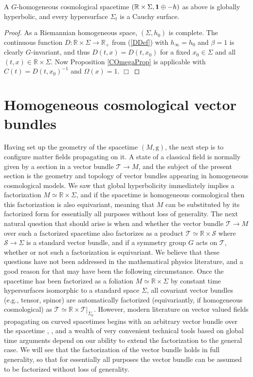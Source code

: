 \documentclass{article}
\begin{document}
\begin{proposition} A $G$-homogeneous cosmological spacetime $(\mathbb{R}\times\Sigma,{\mathbf 1}\oplus-h)$ as above is globally hyperbolic, and every hypersurface $\Sigma_t$ is a Cauchy surface.
\end{proposition}
\begin{proof} As a Riemannian homogeneous space, $(\Sigma,h_0)$ is complete. The continuous function $D:\mathbb{R}\times\Sigma\to\mathbb{R}_+$ from (\ref{DDef}) with $h_\infty=h_0$ and $\beta=1$ is clearly $G$-invariant, and thus $D(t,x)=D(t,x_0)$ for a fixed $x_0\in\Sigma$ and all $(t,x)\in\mathbb{R}\times\Sigma$. Now Proposition \ref{COmegaProp} is applicable with $C(t)=D(t,x_0)^{-1}$ and $\Omega(x)=1$. $\Box$
\end{proof}

\section*{Homogeneous cosmological vector bundles}

Having set up the geometry of the spacetime $(M,\mathrm{g})$, the next step is to configure matter fields propagating on it. A state of a classical field is normally given by a section in a vector bundle $\mathcal{T}\to M$, and the subject of the present section is the geometry and topology of vector bundles appearing in homogeneous cosmological models. We saw that global hyperbolicity immediately implies a factorization $M\simeq\mathbb{R}\times\Sigma$, and if the spacetime is homogeneous cosmological then this factorization is also equivariant, meaning that $M$ can be substituted by its factorized form for essentially all purposes without loss of generality. The next natural question that should arise is when and whether the vector bundle $\mathcal{T}\to M$ over such a factorized spacetime also factorizes as a product $\mathcal{T}\simeq\mathbb{R}\times\mathcal{S}$ where $\mathcal{S}\to\Sigma$ is a standard vector bundle, and if a symmetry group $G$ acts on $\mathcal{T}$, whether or not such a factorization is equivariant. We believe that these questions have not been addressed in the mathematical physics literature, and a good reason for that may have been the following circumstance. Once the spacetime has been factorized as a foliation $M\simeq\mathbb{R}\times\Sigma$ by constant time hypersurfaces isomorphic to a standard space $\Sigma$, all covariant vector bundles (e.g., tensor, spinor) are automatically factorized (equivariantly, if homogeneous cosmological) as $\mathcal{T}\simeq\mathbb{R}\times\mathcal{T}|_{\Sigma_0}$. However, modern literature on vector valued fields propagating on curved spacetimes begins with an arbitrary vector bundle over the spacetime \cite{BaerGinouxPfaeffle2007}, \cite{BrunettiDappiaggiFredenhagenYngvason2015}, and a wealth of very convenient technical tools based on global time arguments depend on our ability to extend the factorization to the general case. We will see that the factorization of the vector bundle holds in full generality, so that for essentially all purposes the vector bundle can be assumed to be factorized without loss of generality.
\end{document}
